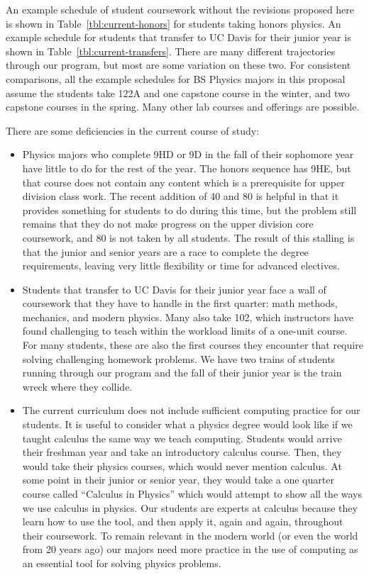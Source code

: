 \documentclass[12pt]{article}
\begin{document}
An example schedule of student coursework without the revisions
proposed here is shown in Table~\ref{tbl:current-honors} for students
taking honors physics.  An example schedule for students that transfer
to UC Davis for their junior year is shown in
Table~\ref{tbl:current-transfers}.  There are many different
trajectories through our program, but most are some variation on these
two.  For consistent comparisons, all the example schedules for BS
Physics majors in this proposal assume the students take 122A and one
capstone course in the winter, and two capstone courses in the spring.
Many other lab courses and offerings are possible.


There are some deficiencies in the current course of study:
\begin{itemize}

\item Physics majors who complete 9HD or 9D in the fall of their
  sophomore year have little to do for the rest of the year.  The
  honors sequence has 9HE, but that course does not contain any
  content which is a prerequisite for upper division class work.  The
  recent addition of 40 and 80 is helpful in that it provides
  something for students to do during this time, but the problem still
  remains that they do not make progress on the upper division core
  coursework, and 80 is not taken by all students.  The result of
  this stalling is that the junior and senior years are a race to
  complete the degree requirements, leaving very little flexibility or
  time for advanced electives.

\item Students that transfer to UC Davis for their junior year face a
  wall of coursework that they have to handle in the first quarter:
  math methods, mechanics, and modern physics.  Many also take 102,
  which instructors have found challenging to teach within the
  workload limits of a one-unit course.  For many students, these are
  also the first courses they encounter that require solving
  challenging homework problems.  We have two trains of students
  running through our program and the fall of their junior year is the
  train wreck where they collide.

\item The current curriculum does not include sufficient computing
  practice for our students.  It is useful to consider what a physics
  degree would look like if we taught calculus the same way we teach
  computing.  Students would arrive their freshman year and take an
  introductory calculus course.  Then, they would take their physics
  courses, which would never mention calculus.  At some point in their
  junior or senior year, they would take a one quarter course called
  ``Calculus in Physics'' which would attempt to show all the ways we
  use calculus in physics.  Our students are experts at calculus
  because they learn how to use the tool, and then apply it, again and
  again, throughout their coursework.  To remain relevant in the
  modern world (or even the world from 20 years ago) our majors need
  more practice in the use of computing as an essential tool for
  solving physics problems.


\end{itemize}
\end{document}
